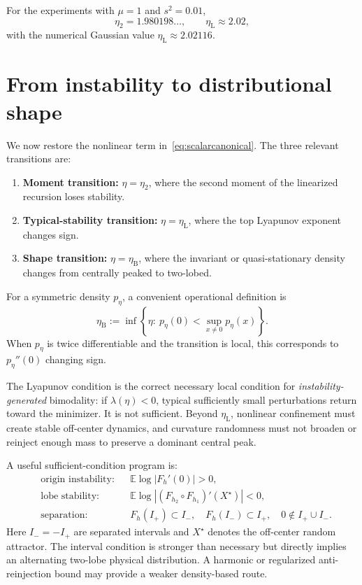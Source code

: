 \documentclass[11pt]{article}
\newcommand{\E}{\mathbb{E}}
\newcommand{\etal}{\eta_{\mathrm L}}
\newcommand{\etams}{\eta_{2}}
\newcommand{\etab}{\eta_{\mathrm B}}
\begin{document}
For the experiments with $\mu=1$ and $s^2=0.01$,
\begin{equation}
    \etams=1.980198\ldots,
    \qquad
    \etal\approx2.02,
\end{equation}
with the numerical Gaussian value $\etal\approx2.02116$.

\section{From instability to distributional shape}

We now restore the nonlinear term in~\eqref{eq:scalarcanonical}.  The three relevant transitions are:
\begin{enumerate}[leftmargin=1.6em,itemsep=0.25em]
    \item \textbf{Moment transition:} $\eta=\eta_2$, where the second moment of the linearized recursion loses stability.
    \item \textbf{Typical-stability transition:} $\eta=\etal$, where the top Lyapunov exponent changes sign.
    \item \textbf{Shape transition:} $\eta=\etab$, where the invariant or quasi-stationary density changes from centrally peaked to two-lobed.
\end{enumerate}
For a symmetric density $p_\eta$, a convenient operational definition is
\begin{equation}
    \etab:=\inf\left\{\eta:\ p_\eta(0)<\sup_{x\neq0}p_\eta(x)\right\}.
    \label{eq:bimodaledge}
\end{equation}
When $p_\eta$ is twice differentiable and the transition is local, this corresponds to $p_\eta''(0)$ changing sign.

The Lyapunov condition is the correct necessary local condition for \emph{instability-generated} bimodality: if $\lambda(\eta)<0$, typical sufficiently small perturbations return toward the minimizer.  It is not sufficient.  Beyond $\etal$, nonlinear confinement must create stable off-center dynamics, and curvature randomness must not broaden or reinject enough mass to preserve a dominant central peak.

A useful sufficient-condition program is:
\begin{align}
 &\text{origin instability:} && \E\log|F_h'(0)|>0,\\
 &\text{lobe stability:} && \E\log|(F_{h_2}\circ F_{h_1})'(X^\star)|<0,\\
 &\text{separation:} && F_h(I_+)\subset I_-,\quad F_h(I_-)\subset I_+,
 \quad 0\notin I_+\cup I_-.
 \label{eq:sufficientprogram}
\end{align}
Here $I_-=-I_+$ are separated intervals and $X^\star$ denotes the off-center random attractor.  The interval condition is stronger than necessary but directly implies an alternating two-lobe physical distribution.  A harmonic or regularized anti-reinjection bound may provide a weaker density-based route.
\end{document}
